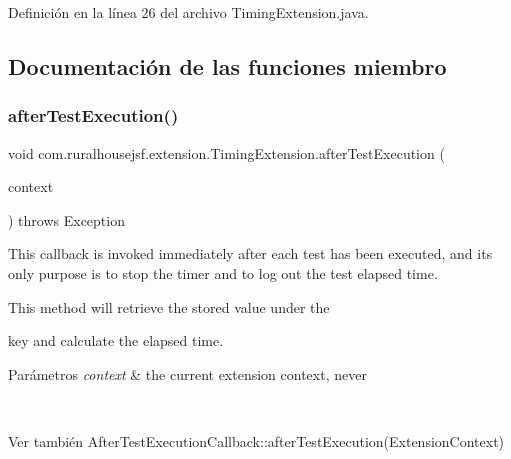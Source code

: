 Definición en la línea 26 del archivo Timing\+Extension.\+java.



\subsection{Documentación de las funciones miembro}
\mbox{\label{classcom_1_1ruralhousejsf_1_1extension_1_1_timing_extension_a300725ce5f0290e9878185e05d84c019}} 
\subsubsection{\texorpdfstring{afterTestExecution()}{afterTestExecution()}}
{\footnotesize\ttfamily void com.\+ruralhousejsf.\+extension.\+Timing\+Extension.\+after\+Test\+Execution (\begin{DoxyParamCaption}\item[{Extension\+Context}]{context }\end{DoxyParamCaption}) throws Exception}

This callback is invoked {\ttfamily immediately after} each test has been executed, and its only purpose is to stop the timer and to log out the test elapsed time. 

This method will retrieve the stored value under the
\begin{DoxyCode}{0}
\end{DoxyCode}


key and calculate the elapsed time.


\begin{DoxyParams}{Parámetros}
{\em context} & the current extension context, never
\begin{DoxyCode}{1}
\DoxyCodeLine{\textcolor{keyword}{null} }
\end{DoxyCode}
\\
\hline
\end{DoxyParams}
\begin{DoxySeeAlso}{Ver también}
After\+Test\+Execution\+Callback\+::after\+Test\+Execution(\+Extension\+Context) 
\end{DoxySeeAlso}


